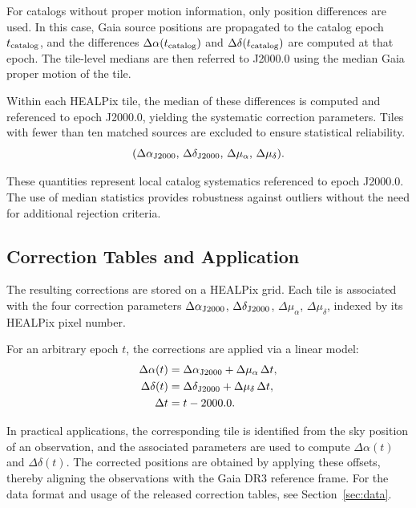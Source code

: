 \documentclass[linenumbers,amsmath,manuscript]{aastex702}
\begin{document}
For catalogs without proper motion information, only position differences are used. In this case, Gaia source positions are propagated to the catalog epoch $t_{\rm catalog}$, and the differences $\Delta\alpha(t_{\rm catalog})$ and $\Delta\delta(t_{\rm catalog})$ are computed at that epoch. The tile-level medians are then referred to J2000.0 using the median Gaia proper motion of the tile.

Within each HEALPix tile, the median of these differences is computed and referenced to epoch J2000.0, yielding the systematic correction parameters. Tiles with fewer than ten matched sources are excluded to ensure statistical reliability.
\begin{equation}
(\Delta \alpha_{\rm J2000},\, \Delta \delta_{\rm J2000},\, \Delta \mu_{\alpha},\, \Delta \mu_{\delta}).
\end{equation}

These quantities represent local catalog systematics referenced to epoch J2000.0. The use of median statistics provides robustness against outliers without the need for additional rejection criteria.

\subsection{Correction Tables and Application} \label{subsec:correction_application}

The resulting corrections are stored on a HEALPix grid. Each tile is associated with the four correction parameters $\Delta\alpha_{\rm J2000}$, $\Delta\delta_{\rm J2000}$, $\Delta\mu_\alpha$, $\Delta\mu_\delta$, indexed by its HEALPix pixel number.

For an arbitrary epoch $t$, the corrections are applied via a linear model:
\begin{equation}
\begin{aligned}
\Delta \alpha(t) &= \Delta \alpha_{\rm J2000} + \Delta \mu_{\alpha}\,\Delta t,\\
\Delta \delta(t) &= \Delta \delta_{\rm J2000} + \Delta \mu_{\delta}\,\Delta t,\\
\Delta t &= t - 2000.0.
\end{aligned}
\end{equation}

In practical applications, the corresponding tile is identified from the sky position of an observation, and the associated parameters are used to compute $\Delta \alpha(t)$ and $\Delta \delta(t)$. The corrected positions are obtained by applying these offsets, thereby aligning the observations with the Gaia DR3 reference frame. For the data format and usage of the released correction tables, see Section~\ref{sec:data}.
\end{document}

